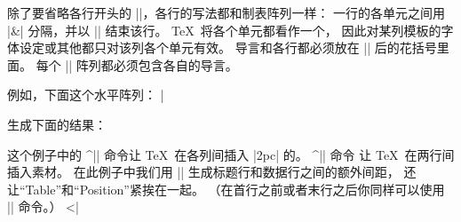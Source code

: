 \li 除了要省略各行开头的 |\+|，各行的写法都和制表阵列一样：
一行的各单元之间用 |&| 分隔，并以 |\cr| 结束该行。
\TeX\ 将各个单元都看作一个，
因此对某列模板的字体设定或其他都只对该列各个单元有效。
\endulist
\noindent 导言和各行都必须放在 |\halign| 后的花括号里面。
每个 |\halign| 阵列都必须包含各自的导言。

例如，下面这个水平阵列：
\csdisplay
\tabskip=2pc
|

\noindent 生成下面的结果：

%
\noindent 这个例子中的 ^|\tabskip| \ctsref{\tabskip}
命令让 \TeX\ 在各列间插入 |2pc| 的。
^|\noalign| \ctsref{\noalign} 命令%
让 \TeX\ 在两行间插入素材。
在此例子中我们用 |\noalign| 生成标题行和数据行之间的额外间距，
还让“Table”和“Position”紧挨在一起。%
（在首行之前或者末行之后你同样可以使用 |\noalign| 命令。）
\eix^^|\halign|

